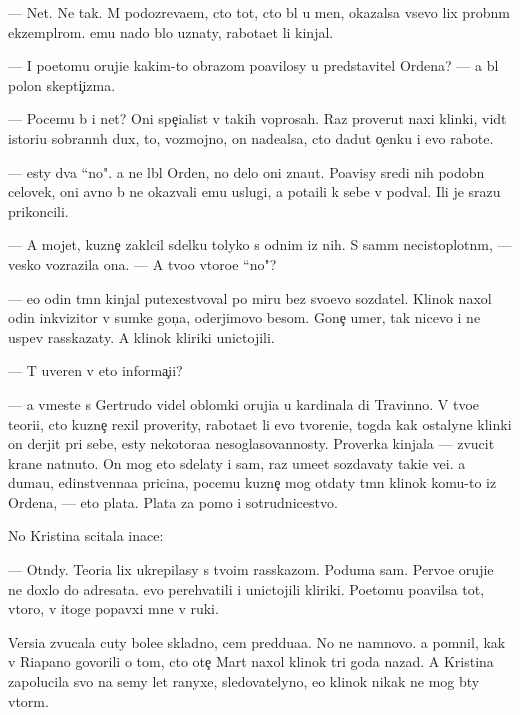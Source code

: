 \documentclass[10pt]{book}
\begin{document}
— Net. Ne tak. M{\yi} podozreva{\y}em, cto tot, cto b{\yi}l u men{\ia}, okazalsa vsevo lix probn{\yi}m ekzempl{\ia}rom. {\Y}emu nado b{\yi}lo uznaty, rabota{\y}et li kinjal.

— I poetomu oruji{\y}e kakim-to obrazom po{\y}avilosy u predstavitel{\ia} Ordena? — {\Y}a b{\yi}l polon skepti{\c}izma.

— Pocemu b{\yi} i net? Oni spe{\c}ialist{\yi} v takih voprosah. Raz prover{\ia}{\y}ut naxi klinki, vid{\ia}t istori{\y}u sobrann{\yi}h dux, to, vozmojno, on nade{\y}alsa, cto dadut o{\c}enku i {\y}evo rabote.

— {\Y}esty dva ``no". {\Y}a ne l{\iu}bl{\iu} Orden, no delo oni zna{\y}ut. Po{\y}avisy sredi nih podobn{\yi}{\y} celovek, oni {\y}avno b{\yi} ne okaz{\yi}vali {\y}emu uslugi, a pota{\x}ili k sebe v podval{\yi}. Ili je srazu prikoncili.

— A mojet, kuzne{\c} zakl{\iu}cil sdelku tolyko s odnim iz nih. S sam{\yi}m necistoplotn{\yi}m, — vesko vozrazila ona. — A tvo{\y}o vtoro{\y}e ``no"?

— {\Y}e{\x}o odin t{\e}mn{\yi}{\y} kinjal putexestvoval po miru bez svo{\y}evo sozdatel{\ia}. Klinok naxol odin inkvizitor v sumke gon{\c}a, oderjimovo besom. Gone{\c} umer, tak nicevo i ne uspev rasskazaty. A klinok kliriki unictojili.

— T{\yi} uveren v eto{\y} informa{\c}i{\y}i?

— {\Y}a vmeste s Gertrudo{\y} videl oblomki oruji{\y}a u kardinala di Travinno. V tvo{\y}e{\y} teori{\y}i, cto kuzne{\c} rexil proverity, rabota{\y}et li {\y}evo tvoreni{\y}e, togda kak ostalyn{\yi}{\y}e klinki on derjit pri sebe, {\y}esty nekotora{\y}a nesoglasovannosty. Proverka kinjala — zvucit kra{\y}ne nat{\ia}nuto. On mog eto sdelaty i sam, raz ume{\y}et sozdavaty taki{\y}e ve{\x}i. {\Y}a duma{\y}u, {\y}edinstvenna{\y}a pricina, pocemu kuzne{\c} mog otdaty t{\e}mn{\yi}{\y} klinok komu-to iz Ordena, — eto plata. Plata za pomo{\x} i sotrudnicestvo.

No Kristina scitala inace:

— Otn{\iu}dy. Teori{\y}a lix ukrepilasy s tvo{\y}im rasskazom. Poduma{\y} sam. Pervo{\y}e oruji{\y}e ne doxlo do adresata. {\Y}evo perehvatili i unictojili kliriki. Poetomu po{\y}avilsa tot, vtoro{\y}, v itoge popavxi{\y} mne v ruki.

Versi{\y}a zvucala cuty bole{\y}e skladno, cem pred{\yi}du{\x}a{\y}a. No ne namnovo. {\Y}a pomnil, kak v Riapano govorili o tom, cto ote{\c} Mart naxol klinok tri goda nazad. A Kristina zapolucila svo{\y} na semy let ranyxe, sledovatelyno, {\y}e{\y}o klinok nikak ne mog b{\yi}ty vtor{\yi}m.
\end{document}
